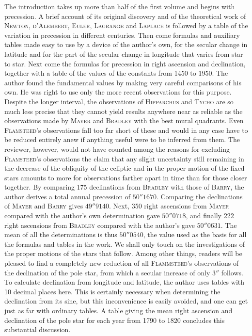The introduction takes up more than half of the first volume and begins with precession. A brief account of its original discovery and of the theoretical work of \textsc{Newton}, \textsc{d’Alembert}, \textsc{Euler}, \textsc{Lagrange} and \textsc{Laplace} is followed by a table of the variation in precession in different centuries. Then come formulas and auxiliary tables made easy to use by a device of the author’s own, for the secular change in latitude and for the part of the secular change in longitude that varies from star to star. Next come the formulas for precession in right ascension and declination, together with a table of the values of the constants from 1450 to 1950. The author found the fundamental values by making very careful comparisons of his own. He was right to use only the more recent observations for this purpose. Despite the longer interval, the observations of \textsc{Hipparchus} and \textsc{Tycho} are so much less precise that they cannot yield results anywhere near as reliable as the observations made by \textsc{Mayer} and \textsc{Bradley} with the best mural quadrants. Even \textsc{Flamsteed}’s observations fall too far short of these and would in any case have to be reduced entirely anew if anything useful were to be inferred from them. The reviewer, however, would not have counted among the reasons for excluding \textsc{Flamsteed}’s observations the claim that any slight uncertainty still remaining in the decrease of the obliquity of the ecliptic and in the proper motion of the fixed stars amounts to more for observations farther apart in time than for those closer together. By comparing 175 declinations from \textsc{Bradley} with those of \textsc{Barry}, the author derives a total annual precession of $50''1670$. Comparing the declinations of \textsc{Mayer} and \textsc{Barry} gives $49''9140$. Next, 350 right ascensions from \textsc{Mayer} compared with the author’s own determination gave $50''0718$, and finally 222 right ascensions from \textsc{Bradley} compared with the author’s gave $50''0631$. The mean of all the determinations is thus $50''0540$, the value used as the basis for all the formulas and tables in the work. We shall only touch on the investigations of the proper motions of the stars that follow. Among other things, readers will be pleased to find a completely new reduction of all \textsc{Flammsteed}’s observations of the declination of the pole star, from which a secular increase of only $3''$ follows. To calculate declination from longitude and latitude, the author uses tables with 10 decimal places here. This is certainly necessary when determining the declination from its sine, but this inconvenience is easily avoided, and one can get just as far with ordinary tables. A table giving the mean right ascension and declination of the pole star for each year from 1790 to 1820 concludes this substantial discussion.

